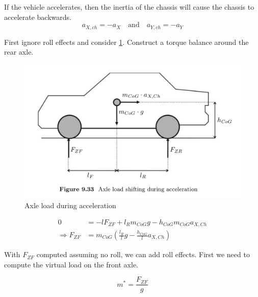 If the vehicle accelerates, then the inertia of the chassis will cause the chassis to accelerate backwards. 
\begin{equation}
  a_{X,ch} = -a_X
  \quad \text{and} \quad
  a_{Y,ch} = -a_Y
\end{equation}


First ignore roll effects and consider \cref{fig:axle-load-during-acceleration}. Construct a torque balance around the rear axle.

\begin{figure}
    \centering
    \includegraphics[width=\textwidth]{draft/stolen-figures/axle-load-during-acceleration.png}
    \caption{Axle load during acceleration}
    \label{fig:axle-load-during-acceleration}
\end{figure}

\begin{align}
  0 &= - l F_{ZF} + l_R m_{CoG} g - h_{CoG} m_{CoG} a_{X,Ch} \\
  \Rightarrow F_{ZF} &= m_{CoG} \left( \frac{l_R}{l}g - \frac{h_{CoG}}{l} a_{X,Ch} \right)
\end{align}

With $F_{ZF}$ computed assuming no roll, we can add roll effects. First we need to compute the virtual load on the front axle.

\begin{equation}
  m^* = \frac{F_{ZF}}{g}
\end{equation}


